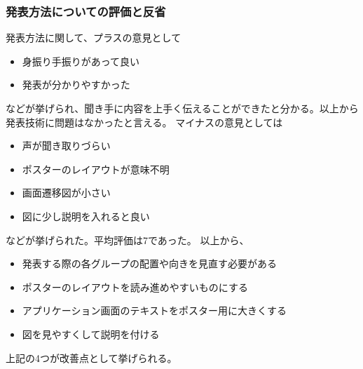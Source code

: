 \documentclass[openany,11pt,papersize]{jsbook}
\begin{document}
\subsubsection{発表方法についての評価と反省}
発表方法に関して、プラスの意見として
\begin{itemize}

\item 身振り手振りがあって良い
\item 発表が分かりやすかった

\end{itemize}
などが挙げられ、聞き手に内容を上手く伝えることができたと分かる。以上から発表技術に問題はなかったと言える。
マイナスの意見としては
\begin{itemize}

\item 声が聞き取りづらい
\item ポスターのレイアウトが意味不明
\item 画面遷移図が小さい
\item 図に少し説明を入れると良い

\end{itemize}
などが挙げられた。平均評価は7であった。
以上から、
\begin{itemize}

\item 発表する際の各グループの配置や向きを見直す必要がある
\item ポスターのレイアウトを読み進めやすいものにする
\item アプリケーション画面のテキストをポスター用に大きくする
\item 図を見やすくして説明を付ける

\end{itemize}
上記の4つが改善点として挙げられる。

\end{document}
